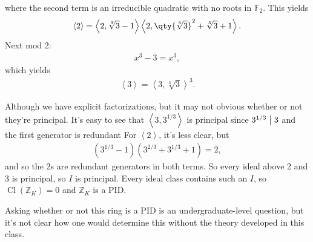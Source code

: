 \begin{example}[?]
where the second term is an irreducible quadratic with no roots in
\({\mathbb{F}}_2\). This yields
\begin{align*}
\left\langle{ 2 }\right\rangle= \left\langle{ 2, \sqrt[3]{3} - 1 }\right\rangle \left\langle{ 2, \qty{\sqrt[3]{3} }^2 + \sqrt[3]{3} + 1 }\right\rangle   
.\end{align*}
Next mod 2:
\begin{align*}
x^3 -3 = x^3
,\end{align*}
which yields
\begin{align*}
\left\langle{ 3 }\right\rangle= \left\langle{ 3, \sqrt[3]{3} }\right\rangle^3  
.\end{align*}

Although we have explicit factorizations, but it may not obvious whether
or not they're principal. It's easy to see that
\(\left\langle{ 3, 3^{1/3} }\right\rangle\) is principal since
\(3^{1/3} \bigm|3\) and the first generator is redundant For
\(\left\langle{2}\right\rangle\), it's less clear, but
\begin{align*}
(3^{1/3} - 1) (3^{2/3} + 3^{1/3} + 1) = 2
,\end{align*}
and so the 2s are redundant generators in both terms. So every ideal
above 2 and 3 is principal, so \(I\) is principal. Every ideal class
contains such an \(I\), so \({ \operatorname{Cl}} ({\mathbb{Z}}_K) = 0\)
and \({\mathbb{Z}}_K\) is a PID.

\end{example}

\begin{remark}

Asking whether or not this ring is a PID is an undergraduate-level
question, but it's not clear how one would determine this without the
theory developed in this class.

\end{remark}

